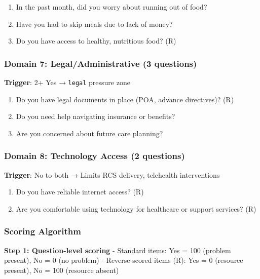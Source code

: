 \documentclass[
]{article}
\providecommand{\tightlist}{%
  \setlength{\itemsep}{0pt}\setlength{\parskip}{0pt}}
\begin{document}
\begin{enumerate}
\def\labelenumi{\arabic{enumi}.}
\setcounter{enumi}{20}
\tightlist
\item
  In the past month, did you worry about running out of food?
\item
  Have you had to skip meals due to lack of money?
\item
  Do you have access to healthy, nutritious food? (R)
\end{enumerate}

\subsubsection{Domain 7: Legal/Administrative (3
questions)}\label{domain-7-legaladministrative-3-questions}

\textbf{Trigger}: 2+ Yes → \texttt{legal} pressure zone

\begin{enumerate}
\def\labelenumi{\arabic{enumi}.}
\setcounter{enumi}{23}
\tightlist
\item
  Do you have legal documents in place (POA, advance directives)? (R)
\item
  Do you need help navigating insurance or benefits?
\item
  Are you concerned about future care planning?
\end{enumerate}

\subsubsection{Domain 8: Technology Access (2
questions)}\label{domain-8-technology-access-2-questions}

\textbf{Trigger}: No to both → Limits RCS delivery, telehealth
interventions

\begin{enumerate}
\def\labelenumi{\arabic{enumi}.}
\setcounter{enumi}{26}
\tightlist
\item
  Do you have reliable internet access? (R)
\item
  Are you comfortable using technology for healthcare or support
  services? (R)
\end{enumerate}

\subsubsection{Scoring Algorithm}\label{scoring-algorithm}

\textbf{Step 1: Question-level scoring} - Standard items: Yes = 100
(problem present), No = 0 (no problem) - Reverse-scored items (R): Yes =
0 (resource present), No = 100 (resource absent)
\end{document}
